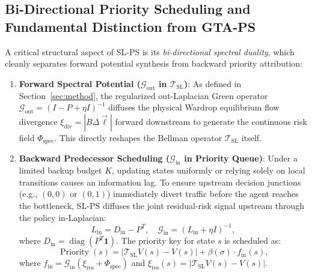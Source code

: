 \documentclass[11pt,a4paper]{article}
\begin{document}
\subsection{Bi-Directional Priority Scheduling and Fundamental Distinction from GTA-PS}
\label{sec:priority_scheduling}

A critical structural aspect of SL-PS is its \textit{bi-directional spectral duality}, which cleanly separates forward potential synthesis from backward priority attribution:
\begin{enumerate}
    \item \textbf{Forward Spectral Potential ($\mathcal{G}_{\text{out}}$ in $\mathcal{T}_{\text{SL}}$)}: As defined in Section~\ref{sec:method}, the regularized out-Laplacian Green operator $\mathcal{G}_{\text{out}} = (I - P + \eta I)^{-1}$ diffuses the physical Wardrop equilibrium flow divergence $\xi_{\text{div}} = |B \Delta \vec{\ell}|$ forward downstream to generate the continuous risk field $\Phi_{\text{spec}}$. This directly reshapes the Bellman operator $\mathcal{T}_{\text{SL}}$ itself.
    \item \textbf{Backward Predecessor Scheduling ($\mathcal{G}_{\text{in}}$ in Priority Queue)}: Under a limited backup budget $K$, updating states uniformly or relying solely on local transitions causes an information lag. To ensure upstream decision junctions (e.g., $(0, 0)$ or $(0, 1)$) immediately divert traffic before the agent reaches the bottleneck, SL-PS diffuses the joint residual-risk signal upstream through the policy in-Laplacian:
    \begin{equation}
    L_{\text{in}} = D_{\text{in}} - P^T, \quad \mathcal{G}_{\text{in}} = (L_{\text{in}} + \eta I)^{-1},
    \end{equation}
    where $D_{\text{in}} = \operatorname{diag}(P^T \mathbf{1})$. The priority key for state $s$ is scheduled as:
    \begin{equation}
    \operatorname{Priority}(s) = |\mathcal{T}_{\text{SL}} V(s) - V(s)| + \beta(\sigma) \cdot f_{\text{in}}(s),
    \end{equation}
    where $f_{\text{in}} = \mathcal{G}_{\text{in}} (\xi_{\text{res}} + \Phi_{\text{spec}})$ and $\xi_{\text{res}}(s) = |\mathcal{T}_{\text{SL}} V(s) - V(s)|$.
\end{enumerate}
\end{document}
